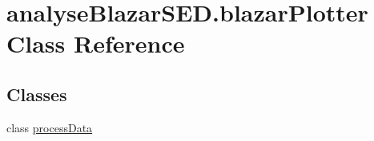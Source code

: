\hypertarget{classanalyseBlazarSED_1_1blazarPlotter}{\section{analyse\-Blazar\-S\-E\-D.\-blazar\-Plotter Class Reference}
\label{classanalyseBlazarSED_1_1blazarPlotter}
}
\subsection*{Classes}
\begin{DoxyCompactItemize}
\item 
class \hyperlink{classanalyseBlazarSED_1_1blazarPlotter_1_1processData}{process\-Data}
\end{DoxyCompactItemize}
